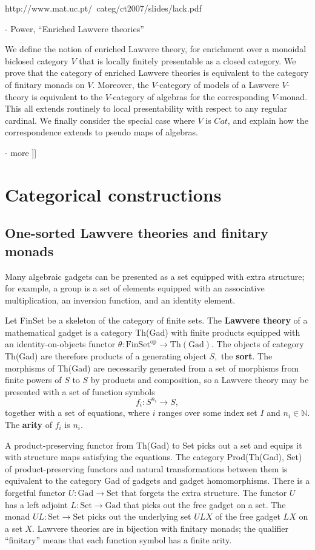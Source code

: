 \documentclass{article}
\newcommand{\maps}{\colon}
\newcommand{\FinSet}{\mathrm{FinSet}}
\newcommand{\Set}{\mathrm{Set}}
\newcommand{\Gad}{\mathrm{Gad}}
\newcommand{\op}{\mathrm{op}}
\newcommand{\NN}{\mathbb{N}}
\begin{document}
  http://www.mat.uc.pt/~categ/ct2007/slides/lack.pdf

- Power, ``Enriched Lawvere theories''

  We define the notion of enriched Lawvere theory, for enrichment over a monoidal biclosed category $V$ that is locally finitely presentable as a closed category. We prove that the category of enriched Lawvere theories is equivalent to the category of finitary monads on $V$. Moreover, the $V$-category of models of a Lawvere $V$-theory is equivalent to the $V$-category of algebras for the corresponding $V$-monad. This all extends routinely to local presentability with respect to any regular cardinal. We finally consider the special case where $V$ is $Cat$, and explain how the correspondence extends to pseudo maps of algebras.

- more
]]

\section{Categorical constructions}

\subsection{One-sorted Lawvere theories and finitary monads}

Many algebraic gadgets can be presented as a set equipped with extra structure; for example, a group is a set of elements equipped with an associative multiplication, an inversion function, and an identity element.

Let FinSet be a skeleton of the category of finite sets.  The {\bf Lawvere theory} of a mathematical gadget is a category Th(Gad) with finite products equipped with an identity-on-objects functor $\theta\maps \FinSet^\op \to \mathrm{Th(Gad)}.$  The objects of category Th(Gad) are therefore products of a generating object $S,$ the {\bf sort}.  The morphisms of Th(Gad) are necessarily generated from a set of morphisms from finite powers of $S$ to $S$ by products and composition, so a Lawvere theory may be presented with a set of function symbols
\[ f_i\maps S^{n_i} \to S, \]
together with a set of equations, where $i$ ranges over some index set $I$ and $n_i \in \NN$.  The {\bf arity} of $f_i$ is $n_i.$

A product-preserving functor from Th(Gad) to Set picks out a set and equips it with structure maps satisfying the equations.  The category Prod(Th(Gad), Set) of product-preserving functors and natural transformations between them is equivalent to the category Gad of gadgets and gadget homomorphisms.  There is a forgetful functor ${U\maps \Gad \to \Set}$ that forgets the extra structure.  The functor $U$ has a left adjoint ${L\maps \Set \to \Gad}$ that picks out the free gadget on a set.  The monad $UL\maps \Set \to \Set$ picks out the underlying set $ULX$ of the free gadget $LX$ on a set $X$.  Lawvere theories are in bijection with finitary monads; the qualifier ``finitary'' means that each function symbol has a finite arity.
\end{document}

